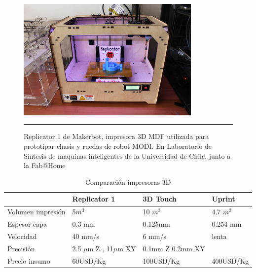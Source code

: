\begin{figure}[htbp]
	\centering
		\includegraphics[width=0.8\textwidth]{./Figures/replicator1.jpg}
		\rule{35em}{0.5pt}
	\caption[Replicator1]{Replicator 1 de Makerbot, impresora 3D MDF utilizada para prototipar chasis y ruedas de robot MODI. En Laboratorio de Síntesis de maquinas inteligentes de la Universidad de Chile, junto a la Fab@Home}
	\label{fig:replicator}
\end{figure}	

\begin{table}\small 
    \begin{tabular}{l|lll}
    ~                     & Replicator 1                          & 3D Touch                   & Uprint      \\ \hline
    Volumen impresión         & 5$ m^{3} $                            & 10 $m^{3}$                 & 4.7 $m^{3}$ \\
    Espesor capa      & 0.3 mm                                & 0.125mm                    & 0.254 mm    \\
    Velocidad                 & 40 mm/s                               & 6 mm/s                     & lenta       \\
    Precisión & 2.5 $ \mu $m Z , 11$\mu$m XY  & 0.1mm Z  0.2mm XY  & ~           \\
    Precio insumo   &60USD/Kg	                          &           100USD/Kg         & 400USD/Kg        \\
    
    \end{tabular}
    \caption {Comparación impresoras 3D}
\end{table}


